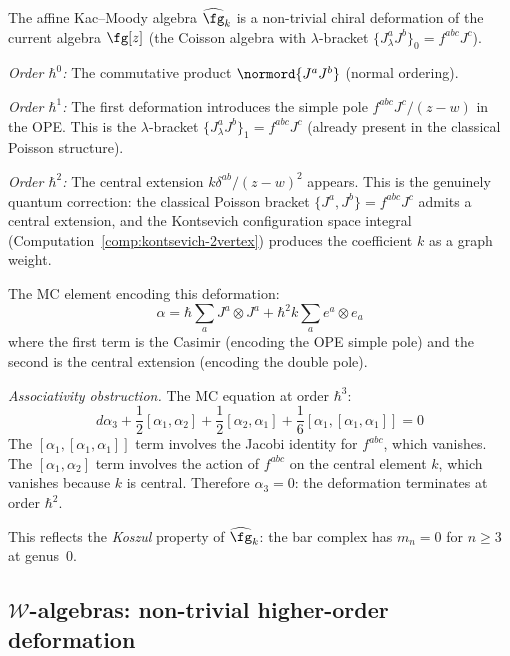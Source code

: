 \begin{computation}
\label{comp:affine-deformation}

The affine Kac--Moody algebra $\widehat{\fg}_k$ is a
non-trivial chiral deformation of the current algebra
$\fg[z]$ (the Coisson algebra with $\lambda$-bracket
$\{J^a_\lambda J^b\}_0 = f^{abc}J^c$).

\emph{Order $\hbar^0$:} The commutative product
$\normord{J^a J^b}$ (normal ordering).

\emph{Order $\hbar^1$:}
The first deformation introduces the simple pole
$f^{abc}J^c/(z-w)$ in the OPE.  This is the $\lambda$-bracket
$\{J^a_\lambda J^b\}_1 = f^{abc}J^c$ (already present in the
classical Poisson structure).

\emph{Order $\hbar^2$:}
The central extension $k\delta^{ab}/(z-w)^2$ appears.
This is the genuinely quantum correction: the classical
Poisson bracket $\{J^a, J^b\} = f^{abc}J^c$ admits a central
extension, and the Kontsevich configuration space integral
(Computation~\ref{comp:kontsevich-2vertex}) produces the
coefficient $k$ as a graph weight.

The MC element encoding this deformation:
\[
\alpha = \hbar \sum_{a} J^a \otimes J^a
+ \hbar^2 k \sum_a e^a \otimes e_a
\]
where the first term is the Casimir (encoding the OPE simple pole)
and the second is the central extension (encoding the double pole).

\emph{Associativity obstruction.}
The MC equation at order $\hbar^3$:
\[
d\alpha_3 + \frac{1}{2}[\alpha_1, \alpha_2]
+ \frac{1}{2}[\alpha_2, \alpha_1]
+ \frac{1}{6}[\alpha_1, [\alpha_1, \alpha_1]] = 0
\]
The $[\alpha_1, [\alpha_1, \alpha_1]]$ term involves the Jacobi
identity for $f^{abc}$, which vanishes.  The $[\alpha_1, \alpha_2]$
term involves the action of $f^{abc}$ on the central element $k$,
which vanishes because $k$ is central.  Therefore $\alpha_3 = 0$:
the deformation terminates at order $\hbar^2$.

This reflects the \emph{Koszul} property of $\widehat{\fg}_k$:
the bar complex has $m_n = 0$ for $n \geq 3$ at genus~0.
\end{computation}

\subsection{$\mathcal{W}$-algebras: non-trivial higher-order deformation}

